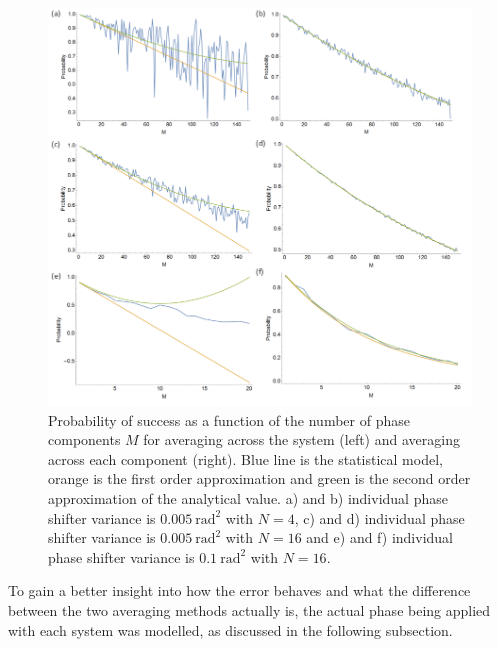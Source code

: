 \documentclass[aps,pra,twocolumn,superscriptaddress,numerical]{revtex4-1}
\begin{document}
		\begin{center}
			\begin{figure}
				\begin{centering}
					\includegraphics[width=\columnwidth]{Psuccess_all.png}
					\par\end{centering}
				
				\caption[Comparison between the probability of success when averaging across the system and each component separately.]{Probability of success as a function of the number of phase components $M$ for averaging across the system (left) and averaging across each component (right). Blue line is the statistical model, orange is the first order approximation and green is the second order approximation of the analytical value. a) and b) individual phase shifter variance is $0.005\ \textrm{rad}^{2}$ with $N=4$, c) and d) individual phase shifter variance is $0.005\ \textrm{rad}^{2}$ with $N=16$ and e) and f) individual phase shifter variance is $0.1\ \textrm{rad}^{2}$ with $N=16$. \label{fig:Probability-of-success all}}
			\end{figure}
			
			\par\end{center}
		
		To gain a better insight into how the error behaves and what the difference between the two averaging methods actually is, the actual phase being applied with each system was modelled, as discussed in the following subsection.
		
\end{document}
